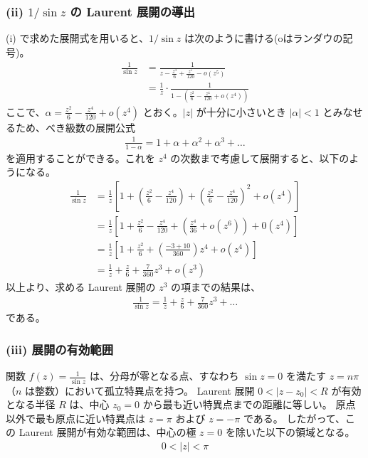 \documentclass[platex,dvipdfmx,a4paper]{jsarticle}
\begin{document}
  \subsubsection*{(ii) $1/\sin z$ の Laurent 展開の導出}
  (i) で求めた展開式を用いると、$1/\sin z$ は次のように書ける(oはランダウの記号)。
  \begin{align*}
    \frac{1}{\sin z} &= \frac{1}{z - \frac{z^3}{6} + \frac{z^5}{120} - o(z^5)} \\
    &= \frac{1}{z} \cdot \frac{1}{1 - \left( \frac{z^2}{6} - \frac{z^4}{120} + o(z^4) \right)}
  \end{align*}
  ここで、$\alpha = \frac{z^2}{6} - \frac{z^4}{120} + o(z^4)$ とおく。$|z|$ が十分に小さいとき $|\alpha| < 1$ とみなせるため、べき級数の展開公式
  \begin{align*}
    \frac{1}{1-\alpha} = 1 + \alpha + \alpha^2 + \alpha^3 + \dots
  \end{align*}
  を適用することができる。これを $z^4$ の次数まで考慮して展開すると、以下のようになる。
  \begin{align*}
    \frac{1}{\sin z} &= \frac{1}{z} \left[ 1 + \left( \frac{z^2}{6} - \frac{z^4}{120} \right) + \left( \frac{z^2}{6} - \frac{z^4}{120} \right)^2 + o(z^4) \right] \\
    &= \frac{1}{z} \left[ 1 + \frac{z^2}{6} - \frac{z^4}{120} + \left( \frac{z^4}{36} + o(z^6) \right) + 0(z^4) \right] \\
    &= \frac{1}{z} \left[ 1 + \frac{z^2}{6} + \left( \frac{-3 + 10}{360} \right) z^4 + o(z^4) \right] \\
    &= \frac{1}{z} + \frac{z}{6} + \frac{7}{360} z^3 + o(z^3)
  \end{align*}
  以上より、求める Laurent 展開の $z^3$ の項までの結果は、
  \begin{align*}
    \frac{1}{\sin z} = \frac{1}{z} + \frac{z}{6} + \frac{7}{360} z^3 + \dots
  \end{align*}
  である。

  \subsubsection*{(iii) 展開の有効範囲}
  関数 $f(z) = \frac{1}{\sin z}$ は、分母が零となる点、すなわち $\sin z = 0$ を満たす $z = n\pi$ （$n$ は整数）において孤立特異点を持つ。
  Laurent 展開 $0 < |z - z_0| < R$ が有効となる半径 $R$ は、中心 $z_0 = 0$ から最も近い特異点までの距離に等しい。
  原点以外で最も原点に近い特異点は $z = \pi$ および $z = -\pi$ である。
  したがって、この Laurent 展開が有効な範囲は、中心の極 $z=0$ を除いた以下の領域となる。
  \begin{align*}
    0 < |z| < \pi
  \end{align*}
\end{document}
